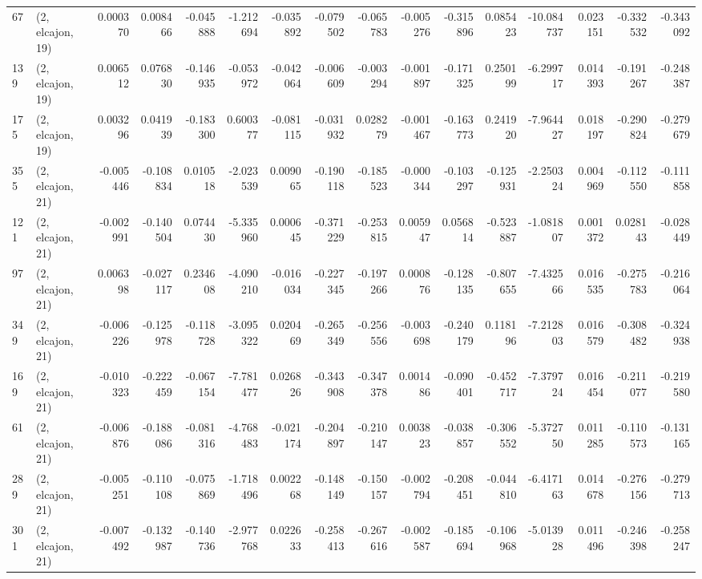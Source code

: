 \begin{tabular}{llrrrrrrrrrrrrrr}
67  &  (2, elcajon, 19) &   0.000370 &  0.008466 & -0.045888 &    -1.212694 &  -0.035892 &  -0.079502 &  -0.065783 & -0.005276 & -0.315896 &  0.085423 &  -10.084737 &  0.023151 & -0.332532 & -0.343092 \\
139 &  (2, elcajon, 19) &   0.006512 &  0.076830 & -0.146935 &    -0.053972 &  -0.042064 &  -0.006609 &  -0.003294 & -0.001897 & -0.171325 &  0.250199 &   -6.299717 &  0.014393 & -0.191267 & -0.248387 \\
175 &  (2, elcajon, 19) &   0.003296 &  0.041939 & -0.183300 &     0.600377 &  -0.081115 &  -0.031932 &   0.028279 & -0.001467 & -0.163773 &  0.241920 &   -7.964427 &  0.018197 & -0.290824 & -0.279679 \\
355 &  (2, elcajon, 21) &  -0.005446 & -0.108834 &  0.010518 &    -2.023539 &   0.009065 &  -0.190118 &  -0.185523 & -0.000344 & -0.103297 & -0.125931 &   -2.250324 &  0.004969 & -0.112550 & -0.111858 \\
121 &  (2, elcajon, 21) &  -0.002991 & -0.140504 &  0.074430 &    -5.335960 &   0.000645 &  -0.371229 &  -0.253815 &  0.005947 &  0.056814 & -0.523887 &   -1.081807 &  0.001372 &  0.028143 & -0.028449 \\
97  &  (2, elcajon, 21) &   0.006398 & -0.027117 &  0.234608 &    -4.090210 &  -0.016034 &  -0.227345 &  -0.197266 &  0.000876 & -0.128135 & -0.807655 &   -7.432566 &  0.016535 & -0.275783 & -0.216064 \\
349 &  (2, elcajon, 21) &  -0.006226 & -0.125978 & -0.118728 &    -3.095322 &   0.020469 &  -0.265349 &  -0.256556 & -0.003698 & -0.240179 &  0.118196 &   -7.212803 &  0.016579 & -0.308482 & -0.324938 \\
169 &  (2, elcajon, 21) &  -0.010323 & -0.222459 & -0.067154 &    -7.781477 &   0.026826 &  -0.343908 &  -0.347378 &  0.001486 & -0.090401 & -0.452717 &   -7.379724 &  0.016454 & -0.211077 & -0.219580 \\
61  &  (2, elcajon, 21) &  -0.006876 & -0.188086 & -0.081316 &    -4.768483 &  -0.021174 &  -0.204897 &  -0.210147 &  0.003823 & -0.038857 & -0.306552 &   -5.372750 &  0.011285 & -0.110573 & -0.131165 \\
289 &  (2, elcajon, 21) &  -0.005251 & -0.110108 & -0.075869 &    -1.718496 &   0.002268 &  -0.148149 &  -0.150157 & -0.002794 & -0.208451 & -0.044810 &   -6.417163 &  0.014678 & -0.276156 & -0.279713 \\
301 &  (2, elcajon, 21) &  -0.007492 & -0.132987 & -0.140736 &    -2.977768 &   0.022633 &  -0.258413 &  -0.267616 & -0.002587 & -0.185694 & -0.106968 &   -5.013928 &  0.011496 & -0.246398 & -0.258247 \\

\end{tabular}
